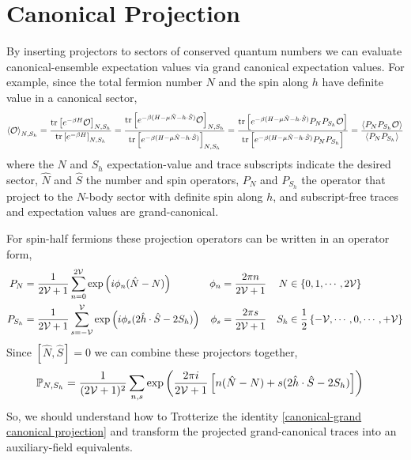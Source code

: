 \section{Canonical Projection}\label{sec:canonical projection}

By inserting projectors to sectors of conserved quantum numbers we can evaluate canonical-ensemble expectation values via grand canonical expectation values.
For example, since the total fermion number $N$ and the spin along $h$ have definite value in a canonical sector,
\begin{align}
    \left\langle \mathcal{O} \right\rangle_{N, S_h}
    =
    \frac{\text{tr}\left[ e^{-\beta H} \mathcal{O}\right]_{N, S_h}}{\text{tr}\left[ e^{-\beta H}\right]_{N, S_h}}
    =
    \frac{\text{tr}\left[ e^{-\beta (H-\mu \hat{N}-h \cdot \hat{S})} \mathcal{O} \right]_{N, S_h}}{\text{tr}\left[ e^{-\beta (H-\mu \hat{N}-h \cdot \hat{S})}\right]_{N, S_h}} 
    =
    \frac{\text{tr}\left[ e^{-\beta (H-\mu\hat{N}-h\cdot \hat{S})} P_N P_{S_h} \mathcal{O}\right]}{\text{tr}\left[ e^{-\beta (H - \mu \hat{N} - h \cdot \hat{S})} P_N P_{S_h}\right]}
    =
    \frac{\left\langle P_N P_{S_h} \mathcal{O} \right\rangle}{\left\langle P_N P_{S_h} \right\rangle}
    \label{eq:canonical-grand canonical projection}
\end{align}
where the $N$ and $S_h$ expectation-value and trace subscripts indicate the desired sector, $\hat{N}$ and $\hat{S}$ the number and spin operators, $P_N$ and $P_{S_h}$ the operator that project to the $N$-body sector with definite spin along $h$, and subscript-free traces and expectation values are grand-canonical.

For spin-half fermions these projection operators can be written in an operator form,
\begin{align}
    P_N &= \frac{1}{2\mathcal{V}+1} \sum_{n=0}^{2\mathcal{V}} \exp\left(i \phi_n (\hat{N}-N)\right)
    &
    \phi_n &= \frac{2\pi n}{2\mathcal{V}+1}
    &
    N &\in \left\{0, 1, \cdots, 2\mathcal{V}\right\}
    \\
    P_{S_h} &= \frac{1}{2\mathcal{V}+1} \sum_{s=-\mathcal{V}}^{\mathcal{V}} \exp\left(i \phi_s (2 \hat{h}\cdot \hat{S} - 2 S_h )\right)
    &
    \phi_s &= \frac{2\pi s}{2\mathcal{V}+1}
    &
    S_h &\in \frac{1}{2} \left\{ -\mathcal{V}, \cdots, 0, \cdots, +\mathcal{V}\right\}
\end{align}
Since $[\hat{N}, \hat{S}]=0$ we can combine these projectors together,
\begin{align}
    \mathbb{P}_{N, S_h} &= \frac{1}{(2\mathcal{V}+1)^2} \sum_{n,s} \exp\left(\frac{2\pi i}{2\mathcal{V}+1}\left[ n (\hat{N}-N) + s (2\hat{h}\cdot\hat{S} - 2 S_h)\right]\right)
\end{align}
So, we should understand how to Trotterize the identity \eqref{canonical-grand canonical projection} and transform the projected grand-canonical traces into an auxiliary-field equivalents.

